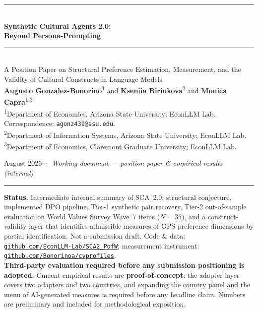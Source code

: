 \documentclass[11pt,letterpaper]{article}
\begin{document}
\thispagestyle{empty}
\begin{center}
{\color{econblue}\rule{\textwidth}{1.1pt}}\\[0.3em]
{\LARGE\bfseries\color{econblue} Synthetic Cultural Agents 2.0:}\\[0.15em]
{\LARGE\bfseries\color{econblue} Beyond Persona-Prompting}\\[0.3em]
{\color{econblue}\rule{\textwidth}{0.55pt}}\\[0.55em]

{\normalsize A Position Paper on Structural Preference Estimation,
Measurement, and the Validity of Cultural Constructs in Language Models}\\[0.7em]

{\large\textbf{Augusto Gonzalez-Bonorino}\textsuperscript{1}
\quad and\quad
\textbf{Kseniia Biriukova}\textsuperscript{2}
\quad and\quad
\textbf{Monica Capra}\textsuperscript{1,3}}\\[0.35em]

{\small\textsuperscript{1}Department of Economics, Arizona State University; EconLLM Lab.
Correspondence: \texttt{agonz439@asu.edu}.}\\[0.1em]
{\small\textsuperscript{2}Department of Information Systems, Arizona State University; EconLLM Lab.}\\[0.1em]
{\small\textsuperscript{3}Department of Economics, Claremont Graduate University; EconLLM Lab.}\\[0.35em]

{\normalsize August 2026 \quad·\quad
\textit{Working document --- position paper \& empirical results (internal)}\\[0.35em]
{\color{econblue}\rule{0.3\textwidth}{0.35pt}}}
\end{center}

\vspace{0.25em}
\noindent
{\footnotesize\color{softgray}
\textbf{Status.} Intermediate internal summary of SCA~2.0: structural conjecture, implemented DPO pipeline, Tier-1 synthetic pair recovery, Tier-2 out-of-sample evaluation on World Values Survey Wave~7 items ($N=35$), and a construct-validity layer that identifies admissible measures of GPS preference dimensions by partial identification. Not a submission draft. Code \& data: \href{https://github.com/EconLLM-Lab/SCA2_PofW}{\texttt{github.com/EconLLM-Lab/SCA2\_PofW}}; measurement instrument: \href{https://github.com/Bonorinoa/cvprofiles}{\texttt{github.com/Bonorinoa/cvprofiles}}.\\[0.2em]
\textbf{Third-party evaluation required before any submission positioning is adopted.} Current empirical results are \textbf{proof-of-concept}: the adapter layer covers two adapters and two countries, and expanding the country panel and the menu of AI-generated measures is required before any headline claim. Numbers are preliminary and included for methodological exposition.
}
\end{document}
